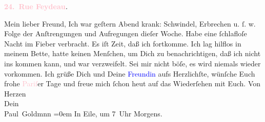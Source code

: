            \pstart
           \begin{otherlanguage}{french}\textcolor{gray}{\textbf{\textbf{\textcolor{pink}{24. Rue Feydeau}{}\ledrightnote{\textcolor{pink}{rue Feydeau}}.}}}\end{otherlanguage}\pend
           \pstart\center{}Mein lieber Freund,\pend\pstart
           Ich war geſtern{ }Abend krank: Schwindel, Erbrechen u. ſ. w. Folge der Anſtrengungen und
               Aufregungen dieſer Woche. Habe eine ſchlafloſe Nacht im Fieber verbracht. Es iſt
               Zeit, daß ich fortkomme. Ich lag hilflos in meinem Bette, hatte keinen Menſchen, um
               Dich zu benachrichtigen, daß ich nicht ins \label{K_L02808-1v}\label{K_L02808-1h} kommen kann, und war verzweifelt. Sei mir nicht böſe, es wird
               niemals wieder vorkommen.\pend
           \pstart
           Ich grüße Dich und Deine {\pb}\textcolor{blue}{Freundin}{} aufs Herzlichſte,
               wünſche Euch frohe \textcolor{pink}{Pariſ}{}\ledrightnote{\textcolor{pink}{Paris}}er Tage und freue mich
               ſchon heut auf das Wiederſehen mit Euch.\pend
           \pstart
           Von Herzen {\\[\baselineskip]}Dein {\\[\baselineskip]}\spacefill\mbox{Paul Goldmnn}\pend
           \leftskip=0em{}\pstart
           \noindent{}In Eile, um 7 Uhr Morgens.\pend
           \endnumbering{}\begin{anhang}\end{anhang}
      